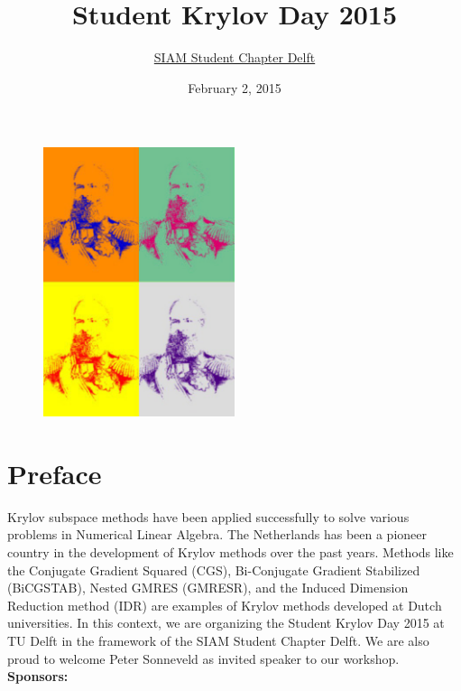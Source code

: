 \documentclass{article}
\title{\bf Student Krylov Day 2015}
\author{\href{http://sscdelft.github.io/activities/2015/02/02/krylov-day.html}{SIAM Student Chapter Delft}}
\date{February 2, 2015}
\begin{document}
\maketitle
\begin{figure}[h]
 \centering
 \includegraphics[width=0.5\textwidth]{krylov_warhol3.png} 
\end{figure}

\section*{Preface}
Krylov subspace methods have been applied successfully to solve various problems 
in Numerical Linear Algebra. The Netherlands has been a pioneer country in the development of Krylov methods over the past years.
Methods like the Conjugate Gradient Squared (CGS), Bi-Conjugate Gradient Stabilized (BiCG\-STAB), Nested GMRES (GMRESR), and the Induced Dimension Reduction method (IDR) are examples of Krylov methods developed at Dutch universities. In this context, 
we are organizing the Student Krylov Day 2015 at TU Delft in the framework of the SIAM Student Chapter Delft. We are also proud to welcome Peter Sonneveld as invited speaker to our workshop.
\newpage
\thispagestyle{empty}
\null
\vfill
\noindent \textbf{Sponsors:}
\end{document}
